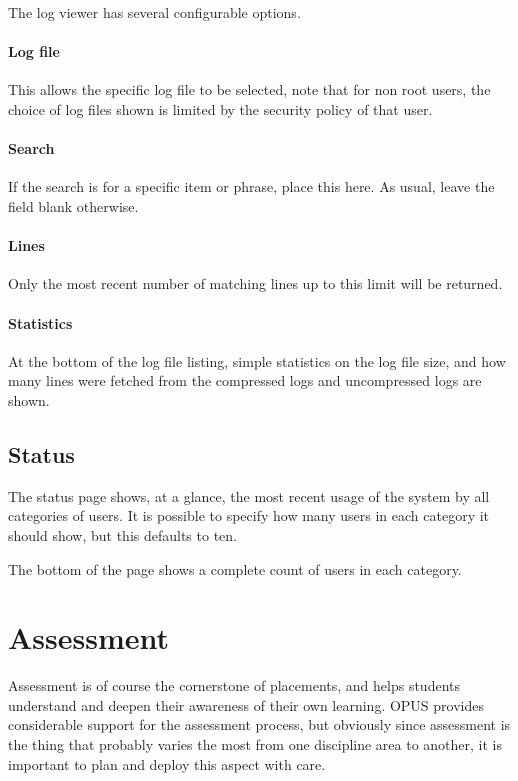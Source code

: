\documentclass[12 pt]{book}
\begin{document}
The log viewer has several configurable options.

\subsubsection{Log file}

This allows the specific log file to be selected, note that for non root users, the choice of log files
shown is limited by the security policy of that user.

\subsubsection{Search}

If the search is for a specific item or phrase, place this here. As usual, leave the field blank otherwise.

\subsubsection{Lines}

Only the most recent number of matching lines up to this limit will be returned.

\subsubsection{Statistics}

At the bottom of the log file listing, simple statistics on the log file size, and how many lines were fetched from the compressed logs and uncompressed logs are shown.

\section{Status}

The status page shows, at a glance, the most recent usage of the system by all categories of
users. It is possible to specify how many users in each category it should show, but this defaults to ten.

The bottom of the page shows a complete count of users in each category.

%
%
%

\chapter{Assessment}

Assessment is of course the cornerstone of placements, and helps students
understand and deepen their awareness of their own learning. OPUS 
provides considerable support for the assessment process, but obviously
since assessment is the thing that probably varies the most from one
discipline area to another, it is important to plan and deploy this
aspect with care.
\end{document}
